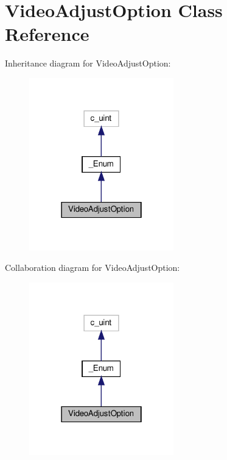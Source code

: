 \hypertarget{classvlc_1_1_video_adjust_option}{}\section{Video\+Adjust\+Option Class Reference}
\label{classvlc_1_1_video_adjust_option}


Inheritance diagram for Video\+Adjust\+Option\+:
\nopagebreak
\begin{figure}[H]
\begin{center}
\leavevmode
\includegraphics[width=178pt]{classvlc_1_1_video_adjust_option__inherit__graph}
\end{center}
\end{figure}


Collaboration diagram for Video\+Adjust\+Option\+:
\nopagebreak
\begin{figure}[H]
\begin{center}
\leavevmode
\includegraphics[width=178pt]{classvlc_1_1_video_adjust_option__coll__graph}
\end{center}
\end{figure}
